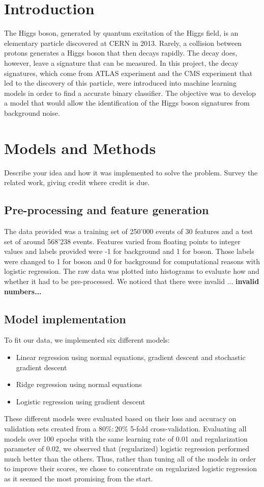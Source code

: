 \documentclass[10pt,conference,compsocconf]{IEEEtran}
\begin{document}
\section{Introduction}\label{sec: introduction}
    The Higgs boson, generated by quantum excitation of the Higgs field, is an elementary particle discovered at CERN in 2013. Rarely, a collision between protons generates a Higgs boson that then decays rapidly. The decay does, however, leave a signature that can be measured. In this project, the decay signatures, which come from ATLAS experiment and the CMS experiment that led to the discovery of this particle, were introduced into machine learning models in order to find a accurate binary classifier. The objective was to develop a model that would allow the identification of the Higgs boson signatures from background noise.
\section{Models and Methods}\label{sec: models_methods}
    Describe your idea and how it was implemented to solve
    the problem. Survey the related work, giving credit where credit is
    due.
    \subsection{Pre-processing and feature generation}\label{subsec:data_cleaning}
    The data provided was a training set of 250'000 events of 30 features and a test set of around 568'238 events. Features varied from floating points to integer values and labels provided were -1 for background and 1 for boson. Those labels were changed to 1 for boson and 0 for background for computational reasons with logistic regression.  The raw data was plotted into histograms to evaluate how and whether it had to be pre-processed. We noticed that there were invalid ...
    \textbf{invalid numbers...
    }
    \subsection{Model implementation}
    To fit our data, we implemented six different models: 
    \begin{itemize}
        \item Linear regression using normal equations, gradient descent and stochastic gradient descent 
        \item Ridge regression using normal equations
        \item Logistic regression using gradient descent 
    \end{itemize}
    These different models were evaluated based on their loss and accuracy on validation sets created from a $80\%:20\%$ 5-fold cross-validation. Evaluating all models over 100 epochs with the same learning rate of 0.01 and regularization parameter of 0.02, we observed that (regularized) logistic regression performed much better than the others. Thus, rather than tuning all of the models in order to improve their scores, we chose to concentrate on regularized logistic regression as it seemed the most promising from the start. 
    
\end{document}
